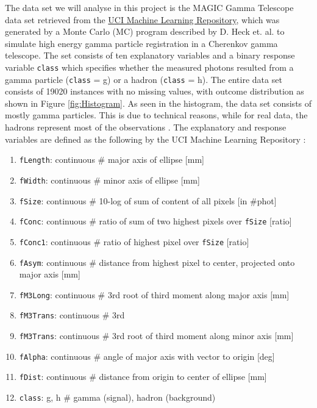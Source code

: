 \documentclass[a4paper, 11pt, twocolumn]{article}
\begin{document}
The data set we will analyse in this project is the MAGIC Gamma Telescope data
set retrieved from the \href{https://archive.ics.uci.edu/ml/datasets/MAGIC+Gamma
+Telescope}{UCI Machine Learning Repository}, which was generated by a Monte
Carlo (MC) program described by D. Heck et. al. \cite{heck1998corsika} to
simulate high energy gamma particle registration in a Cherenkov gamma telescope.
The set consists of ten explanatory variables and a binary response variable
\texttt{class} which specifies whether the measured photons resulted from a gamma
particle (\texttt{class} = g) or a hadron (\texttt{class} = h). The entire data
set consists of 19020 instances with no missing values, with outcome distribution
as shown in Figure \ref{fig:Histogram}. As seen in the histogram, the data set 
consists of mostly gamma particles. This is due to technical reasons, while for 
real data, the hadrons represent most of the observations \cite{Dua:2019}. The 
explanatory and response variables are defined as the following by the UCI 
Machine Learning Repository \cite{Dua:2019}:

\begin{enumerate}[leftmargin=5mm, itemsep=0pt,  parsep=1pt]
  \item \texttt{fLength}: continuous \# major axis of ellipse [mm]
  \item \texttt{fWidth}: continuous \# minor axis of ellipse [mm]
  \item \texttt{fSize}: continuous \# 10-log of sum of content of all pixels
        [in \#phot]
  \item \texttt{fConc}: continuous \# ratio of sum of two highest pixels over
        \texttt{fSize} [ratio]
  \item \texttt{fConc1}: continuous \# ratio of highest pixel over \texttt{fSize}
        [ratio]
  \item \texttt{fAsym}: continuous \# distance from highest pixel to center,
        projected onto major axis [mm]
  \item \texttt{fM3Long}: continuous \# 3rd root of third moment along major
        axis [mm]
  \item \texttt{fM3Trans}: continuous \# 3rd
  \item \texttt{fM3Trans}: continuous \# 3rd root of third moment along minor
        axis [mm]
  \item \texttt{fAlpha}: continuous \# angle of major axis with vector to origin
        [deg]
  \item \texttt{fDist}: continuous \# distance from origin to center of ellipse
        [mm]
  \item \texttt{class}: g, h \# gamma (signal), hadron (background)
\end{enumerate}
\end{document}
